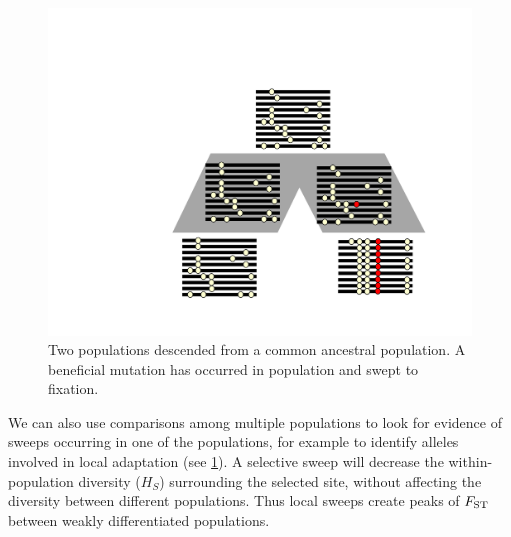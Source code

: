 \begin{figure}
\begin{center}
\includegraphics[width=0.5 \textwidth]{figures/Hitchhiking/two_pops_sweep.pdf}
\end{center}
\caption{Two populations descended from a common ancestral
  population. A beneficial mutation has occurred in population and
  swept to fixation.} \label{fig:local_sweep_haps}
\end{figure}

We can also use comparisons among multiple populations to look for evidence of sweeps occurring in one of the
populations, for example to identify alleles involved in local adaptation (see \ref{fig:local_sweep_haps}). A selective sweep will decrease the within-population diversity ($H_S$)
surrounding the selected site, without affecting the diversity between different
populations. Thus local sweeps create peaks of
$F_{\mathrm{ST}}$ between weakly differentiated populations. 

